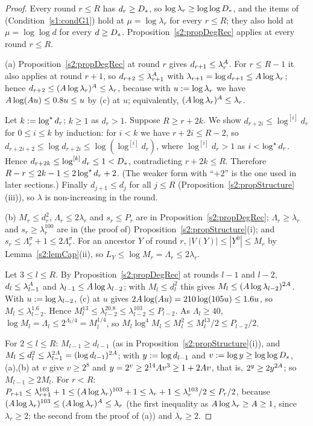 \begin{proof}
Every round $r\le R$ has $d_r\ge D_{*}$, so $\log\lambda_r\ge\log\log D_{*}$, and
the items of  (Condition~\ref{s1:condG1}) hold at $\mu=\log\lambda_r$ for
every $r\le R$; they also hold at $\mu=\log\log d$ for every $d\ge D_{*}$. Proposition~\ref{s2:propDegRec} applies at every round $r\le R$.

(a) Proposition~\ref{s2:propDegRec} at round $r$ gives $d_{r+1}\le
\lambda_r^{A}$. For $r\le R-1$ it also applies at round $r+1$, so
$d_{r+2}\le\lambda_{r+1}^{A}$ with $\lambda_{r+1}=\log d_{r+1}\le A\log
\lambda_r$; hence $d_{r+2}\le(A\log\lambda_r)^{A}\le\lambda_r$, because
with $u\mathrel{:=}\log\lambda_r$ we have $A\log(A u)\le0.8u\le u$ by (c)
at $u$; equivalently, $(A\log\lambda_r)^{A}\le\lambda_r$.

Let $k\mathrel{:=}\log^{\star} d_r$; $k\ge1$ as $d_r>1$. Suppose $R\ge r+2k$. We show
$d_{r+2i}\le\log^{[i]}d_r$ for $0\le i\le k$ by induction: for $i<k$ we have
$r+2i\le R-2$, so $d_{r+2i+2}\le\log d_{r+2i}\le\log(\log^{[i]}d_r)$, where
$\log^{[i]}d_r>1$ as $i<\log^{\star} d_r$. Hence $d_{r+2k}\le\log^{[k]}d_r\le1<D_{*}$,
contradicting $r+2k\le R$. Therefore $R-r\le2k-1\le2\log^{\star} d_r+2$. (The weaker
form with ``$+2$'' is the one used in later sections.) Finally
$d_{j+1}\le d_j$ for all $j\le R$ (Proposition~\ref{s2:propStructure}(iii)), so
$\lambda$ is non-increasing in the round.

(b) $M_r\le d_r^2$, $\Lambda_r\le2\lambda_r$ and $s_r\le P_r$ are in
Proposition~\ref{s2:propDegRec}; $\Lambda_r\ge\lambda_r$ and
$s_r\ge\lambda_r^{100}$ are in (the proof of)
Proposition~\ref{s2:propStructure}(i); and $s_r\le\Lambda_r^\sigma+1\le
2\Lambda_r^\sigma$. For an ancestor $Y$ of round $r$, $|V(Y)|\le|Y^0|\le M_r$
by Lemma~\ref{s2:lemCap}(ii), so $L_Y\le\log M_r=\Lambda_r\le2\lambda_r$.

Let $3\le l\le R$. By Proposition~\ref{s2:propDegRec} at rounds $l-1$ and
$l-2$, $d_l\le\lambda_{l-1}^{A}$ and $\lambda_{l-1}\le A\log
\lambda_{l-2}$; with $M_l\le d_l^2$ this gives
$M_l\le(A\log\lambda_{l-2})^{2A}$. With $u\mathrel{:=}\log\lambda_{l-2}$, (c) at $u$ gives
$2A\log(A u)=210\log(105u)\le1.6u$, so
$M_l\le\lambda_{l-2}^{1.6}$. Hence $M_l^{13}\le\lambda_{l-2}^{20.8}\le
\lambda_{l-2}^{103}\le P_{l-2}$. As $\Lambda_l\ge40$, $\log M_l=\Lambda_l\le
2^{\Lambda_l/4}=M_l^{1/4}$, so $M_l\log^4M_l\le M_l^2\le M_l^{13}/2\le
P_{l-2}/2$.

For $2\le l\le R$: $M_{l-1}\ge d_{l-1}$ (as in
Proposition~\ref{s2:propStructure}(i)), and $M_l\le d_l^2\le
\lambda_{l-1}^{2A}=(\log d_{l-1})^{2A}$; with $y\mathrel{:=}\log d_{l-1}$ and $v\mathrel{:=}\log y\ge\log\log D_{*}$, (a),(b) at $v$
give $v\ge2^8$ and $y=2^v\ge2^{14}A v^3\ge1+2A v$, that is, $2^y\ge2y^{2A}$; so
$M_{l-1}\ge2M_l$. For $r<R$:
$P_{r+1}\le\lambda_{r+1}^{103}+1\le(A\log\lambda_r)^{103}+1\le\lambda_r+1\le
\lambda_r^{103}/2\le P_r/2$, because
$(A\log\lambda_r)^{103}\le(A\log\lambda_r)^{A}\le\lambda_r$ (the
first inequality as $A\log\lambda_r\ge A\ge1$, since $\lambda_r\ge2$; the
second from the proof of (a)) and $\lambda_r\ge2$.


\end{proof}
